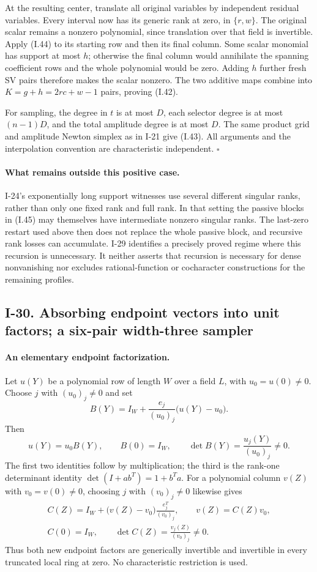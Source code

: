 \documentclass[11pt,a4paper]{article}
\theoremstyle{definition}\newtheorem{definition}{Definition}
\begin{document}
At the resulting center, translate all original variables
by independent residual variables.  Every interval now
has its generic rank at zero, in $\{r,w\}$.  The original
scalar remains a nonzero polynomial, since translation
over that field is invertible.  Apply (I.44) to its starting
row and then its final column.  Some scalar monomial has
support at most $h$; otherwise the final column would
annihilate the spanning coefficient rows and the whole
polynomial would be zero.  Adding $h$ further fresh SV pairs
therefore makes the scalar nonzero.  The two additive maps
combine into $K=g+h=2rc+w-1$ pairs, proving (I.42).

For sampling, the degree in $t$ is at most $D$, each selector
degree is at most $(n-1)D$, and the total amplitude degree
is at most $D$.  The same product grid and amplitude Newton
simplex as in I-21 give (I.43).  All arguments and the
interpolation convention are characteristic independent.
\hfill$\square$

\paragraph{What remains outside this positive case.}
I-24's exponentially long support witnesses use several
different singular ranks, rather than only one fixed rank
and full rank.  In that setting the passive blocks in
(I.45) may themselves have intermediate nonzero singular
ranks.  The last-zero restart used above then does not
replace the whole passive block, and recursive rank losses
can accumulate.  I-29 identifies a precisely proved regime
where this recursion is unnecessary.  It neither asserts
that recursion is necessary for dense nonvanishing nor
excludes rational-function or cocharacter constructions
for the remaining profiles.


\subsection{I-30. Absorbing endpoint vectors into unit factors; a six-pair width-three sampler}
\label{I-30}

\paragraph{An elementary endpoint factorization.}
Let $u(Y)$ be a polynomial row of length $W$ over a field $L$,
with $u_0=u(0)\ne0$.  Choose $j$ with $(u_0)_j\ne0$ and set
\[
 B(Y)=I_W+\frac{e_j}{(u_0)_j}\bigl(u(Y)-u_0\bigr).
 \tag{I.46}
\]
Then
\[
 u(Y)=u_0B(Y),\qquad B(0)=I_W,\qquad
 \det B(Y)=\frac{u_j(Y)}{(u_0)_j}\ne0.
\]
The first two identities follow by multiplication; the third
is the rank-one determinant identity
$\det(I+ab^T)=1+b^Ta$.
For a polynomial column $v(Z)$ with $v_0=v(0)\ne0$, choosing
$j$ with $(v_0)_j\ne0$ likewise gives
\[
 \begin{gathered}
 C(Z)=I_W+\bigl(v(Z)-v_0\bigr)\frac{e_j^T}{(v_0)_j},
 \qquad v(Z)=C(Z)v_0,\\
 C(0)=I_W,
 \qquad \det C(Z)=\frac{v_j(Z)}{(v_0)_j}\ne0.
 \end{gathered}
 \tag{I.47}
\]
Thus both new endpoint factors are generically invertible and
invertible in every truncated local ring at zero.  No
characteristic restriction is used.
\end{document}
